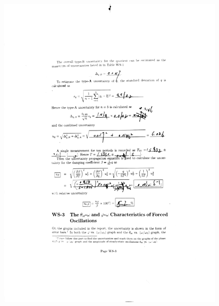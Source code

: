 \documentclass[a4paper]{report}
\begin{document}
		\begin{figure}[H]
		\centering
		\includegraphics[width=1\linewidth]{8.jpg}
	\end{figure}
\end{document}
